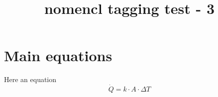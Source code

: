 \documentclass{article}
\title{nomencl tagging test - 3}
\begin{document}
\section*{Main equations}
Here an equation
\begin{equation}\label{eq:heatflux}
    \dot{Q} = k \cdot A \cdot \Delta T
\end{equation}%
%
%
\printnomenclature
\end{document}
